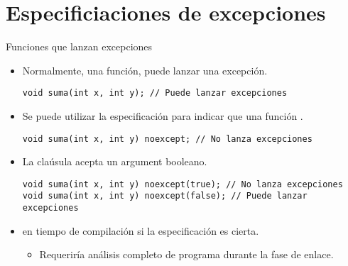 \section{Especificiaciones de excepciones}

\begin{frame}[t,fragile]{Funciones que lanzan excepciones}
\begin{itemize}
  \item Normalmente, una función, puede lanzar una excepción.
\begin{lstlisting}
void suma(int x, int y); // Puede lanzar excepciones
\end{lstlisting}

  \item Se puede utilizar la especificación  para
        indicar que una función .
\begin{lstlisting}
void suma(int x, int y) noexcept; // No lanza excepciones
\end{lstlisting}

  \item La claúsula  acepta un argument booleano.
\begin{lstlisting}
void suma(int x, int y) noexcept(true); // No lanza excepciones
void suma(int x, int y) noexcept(false); // Puede lanzar excepciones
\end{lstlisting}


  \item {} en tiempo de compilación 
        si la especificación es cierta.
    \begin{itemize}
      \item Requeriría análisis completo de programa durante la fase de enlace.
    \end{itemize}
\end{itemize}
\end{frame}

